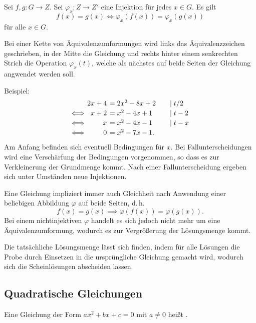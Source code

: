 \newpage\noindent
Sei $f,g\colon G\to Z$. Sei $\varphi_x\colon Z\to Z'$ eine Injektion
für jedes $x\in G$. Es gilt
\begin{equation}
f(x)=g(x) \iff \varphi_x(f(x))=\varphi_x(g(x))
\end{equation}
für alle $x\in G$.

Bei einer Kette von Äquivalenzumformungen wird links das
Äquivalenzzeichen geschrieben, in der Mitte die Gleichung
und rechts hinter einem senkrechten Strich die Operation
$\varphi_x(t)$, welche als nächstes auf beide Seiten der Gleichung
angwendet werden soll.

Beispiel:
\begin{equation*}\setlength{\arraycolsep}{2pt}
\begin{array}{rrl@{\qquad}l}
& 2x+4 &= 2x^2-8x+2 &\mid t/2\\[2pt]
\Longleftrightarrow& x+2 &= x^2-4x+1 &\mid t-2\\[2pt]
\Longleftrightarrow& x &= x^2-4x-1 &\mid t-x\\[2pt]
\Longleftrightarrow& 0 &= x^2-7x-1.
\end{array}
\end{equation*}
Am Anfang befinden sich eventuell Bedingungen für $x$.
Bei Fallunterscheidungen wird eine Verschärfung der Bedingungen
vorgenommen, so dass es zur Verkleinerung der Grundmenge kommt.
Nach einer Fallunterscheidung ergeben sich unter Umständen neue
Injektionen.

Eine Gleichung impliziert immer auch Gleichheit nach
Anwendung einer beliebigen Abbildung $\varphi$ auf beide
Seiten, d.\,h.
\begin{equation}
f(x)=g(x)\implies \varphi(f(x))=\varphi(g(x)).
\end{equation}
Bei einem nichtinjektiven $\varphi$ handelt es sich jedoch
nicht mehr um eine Äquivalenzumformung, wodurch es zur Vergrößerung
der Lösungsmenge kommt. 

Die tatsächliche Lösungsmenge lässt sich finden, indem für alle
Lösungen die Probe durch Einsetzen in die ursprüngliche Gleichung
gemacht wird, wodurch sich die Scheinlösungen abscheiden lassen.


\subsection{Quadratische Gleichungen}
\begin{definition}\mbox{}\newline
Eine Gleichung der Form $ax^2+bx+c=0$ mit $a\ne 0$ heißt
.
\end{definition}

